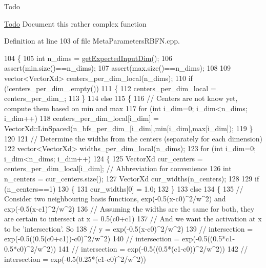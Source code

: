 \begin{DoxyRefDesc}{Todo}
\item[\hyperlink{todo__todo000013}{Todo}]Document this rather complex function \end{DoxyRefDesc}


Definition at line 103 of file Meta\+Parameters\+R\+B\+F\+N.\+cpp.


\begin{DoxyCode}
104 \{
105   \textcolor{keywordtype}{int} n\_dims = \hyperlink{classDmpBbo_1_1MetaParameters_af5a550bcf65d5a29a153a594cc4e3fa1}{getExpectedInputDim}();
106   assert(min.size()==n\_dims);
107   assert(max.size()==n\_dims);
108     
109   vector<VectorXd> centers\_per\_dim\_local(n\_dims); 
110   \textcolor{keywordflow}{if} (!centers\_per\_dim\_.empty())
111   \{
112     centers\_per\_dim\_local = centers\_per\_dim\_;
113   \}
114   \textcolor{keywordflow}{else}
115   \{
116     \textcolor{comment}{// Centers are not know yet, compute them based on min and max}
117     \textcolor{keywordflow}{for} (\textcolor{keywordtype}{int} i\_dim=0; i\_dim<n\_dims; i\_dim++)
118       centers\_per\_dim\_local[i\_dim] = VectorXd::LinSpaced(n\_bfs\_per\_dim\_[i\_dim],min[i\_dim],max[i\_dim]);
119   \}
120   
121   \textcolor{comment}{// Determine the widths from the centers (separately for each dimension)}
122   vector<VectorXd> widths\_per\_dim\_local(n\_dims); 
123   \textcolor{keywordflow}{for} (\textcolor{keywordtype}{int} i\_dim=0; i\_dim<n\_dims; i\_dim++)
124   \{
125     VectorXd cur\_centers = centers\_per\_dim\_local[i\_dim]; \textcolor{comment}{// Abbreviation for convenience}
126     \textcolor{keywordtype}{int} n\_centers = cur\_centers.size();
127     VectorXd cur\_widths(n\_centers);
128 
129     \textcolor{keywordflow}{if} (n\_centers==1)
130     \{
131       cur\_widths[0] = 1.0;
132     \}
133     \textcolor{keywordflow}{else}
134     \{
135       \textcolor{comment}{// Consider two neighbouring basis functions, exp(-0.5(x-c0)^2/w^2) and exp(-0.5(x-c1)^2/w^2)}
136       \textcolor{comment}{// Assuming the widths are the same for both, they are certain to intersect at x = 0.5(c0+c1)}
137       \textcolor{comment}{// And we want the activation at x to be 'intersection'. So}
138       \textcolor{comment}{//            y = exp(-0.5(x-c0)^2/w^2)}
139       \textcolor{comment}{// intersection = exp(-0.5((0.5(c0+c1))-c0)^2/w^2)}
140       \textcolor{comment}{// intersection = exp(-0.5((0.5*c1-0.5*c0)^2/w^2))}
141       \textcolor{comment}{// intersection = exp(-0.5((0.5*(c1-c0))^2/w^2))}
142       \textcolor{comment}{// intersection = exp(-0.5(0.25*(c1-c0)^2/w^2))}

\end{DoxyCode}
